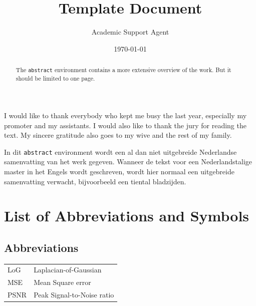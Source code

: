 \documentclass{article}
\title{Template Document}
\author{Academic Support Agent}
\date{\today}
\begin{document}
\maketitle

\begin{preface}
  I would like to thank everybody who kept me busy the last year,
  especially my promoter and my assistants. I would also like to thank the
  jury for reading the text. My sincere gratitude also goes to my wive and
  the rest of my family.
\end{preface}



\begin{abstract}
  The \texttt{abstract} environment contains a more extensive overview of
  the work. But it should be limited to one page.

  \lipsum[1]
\end{abstract}

\begin{abstract*}
  In dit \texttt{abstract} environment wordt een al dan niet uitgebreide
  Nederlandse samenvatting van het werk gegeven.
  Wanneer de tekst voor een Nederlandstalige master in het Engels wordt
  geschreven, wordt hier normaal een uitgebreide samenvatting verwacht,
  bijvoorbeeld een tiental bladzijden. 

  \lipsum[1]
\end{abstract*}

%
%

\chapter{List of Abbreviations and Symbols}
\section*{Abbreviations}
\begin{flushleft}
  \renewcommand{\arraystretch}{1.1}
  \begin{tabularx}{\textwidth}{@{}p{12mm}X@{}}
    LoG   & Laplacian-of-Gaussian \\
    MSE   & Mean Square error \\
    PSNR  & Peak Signal-to-Noise ratio \\
  \end{tabularx}
\end{flushleft}
\end{document}
